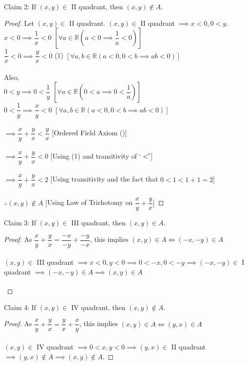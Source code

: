 %
%
Claim 2: If $(x, y) \in$ II quadrant, then $(x, y)\not\in A$.
\begin{proof}Let $(x, y) \in$ II quadrant.
$(x, y) \in$ II quadrant $\implies x < 0, 0 < y$.\\
$x < 0 \implies \dfrac{1}{x} < 0$ \hfill $\left[\forall a \in \mathbb{R}\left(a < 0 \implies \dfrac{1}{a} < 0\right)\right]$\\
$\dfrac{1}{x} < 0 \implies \dfrac{y}{x} < 0$ \hfill (1) $\left[\forall a, b \in \mathbb{R}\left(a < 0, 0 < b \implies ab < 0\right)\right]$\\~\\
Also, \\
$0 < y \implies 0 < \dfrac{1}{y}$ \hfill $\left[\forall a \in \mathbb{R}\left(0 < a \implies 0 < \dfrac{1}{a} \right)\right]$\\
$0 < \dfrac{1}{y} \implies \dfrac{x}{y} < 0$ \hfill $\left[\forall a, b \in \mathbb{R}\left(a < 0, 0 < b \implies ab < 0\right)\right]$\\~\\
$\implies \dfrac{x}{y} + \dfrac{y}{x} < \dfrac{y}{x}$ \hfill [Ordered Field Axiom ()]\\~\\
$\implies \dfrac{x}{y} + \dfrac{y}{x} < 0$ \hfill [Using (1) and transitivity of $`<'$]\\~\\
$\implies \dfrac{x}{y} + \dfrac{y}{x} < 2$ \hfill [Using transitivity and the fact that $0<1<1+1=2$]\\~\\
$\therefore (x, y) \not \in A$ \hfill $\Bigg[$Using Law of Trichotomy on $\dfrac{x}{y} + \dfrac{y}{x}\Bigg]$
\end{proof}
%
%
Claim 3: If $(x, y) \in$ III quadrant, then $(x, y) \in A$.
\begin{proof}
As $\dfrac{x}{y} + \dfrac{y}{x} = \dfrac{-x}{-y} + \dfrac{-y}{-x}$, this implies $(x, y) \in A\iff(-x, -y) \in A$\\\phantom{ } \\
$(x, y) \in$ III quadrant $\implies x < 0, y < 0 \implies 0 < -x, 0 < -y \implies (-x, -y) \in$ I quadrant $\implies (-x, -y) \in A \implies (x, y) \in A$\\~\\
\end{proof}
%
%
Claim 4: If $(x, y) \in$ IV quadrant, then $(x, y)\not\in A$.
\begin{proof}
As $\dfrac{x}{y} + \dfrac{y}{x} = \dfrac{y}{x} + \dfrac{x}{y}$, this implies $(x, y) \in A\iff(y, x) \in A$\\ \phantom{ }\\
$(x, y) \in$ IV quadrant $\implies 0 < x, y < 0 \implies (y, x) \in$ II quadrant $\implies (y, x) \not\in A \implies (x, y) \not\in A$.
\end{proof}
